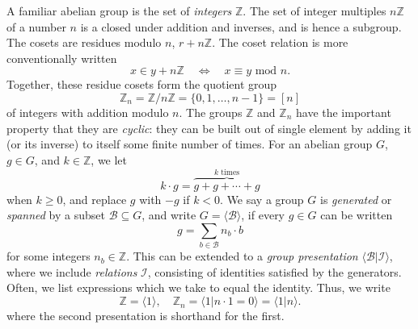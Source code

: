 \documentclass[aps, pre,reprint,nofootinbib,citeautoscript,floatfix]{revtex4-1}
\begin{document}
A familiar abelian group is the set of \emph{integers} $\mathbb{Z}$.
The set of integer multiples $n\mathbb{Z}$ of a number $n$ is a closed under
addition and inverses, and is hence a subgroup.
The cosets are residues modulo $n$, $r + n\mathbb{Z}$. The coset
relation is more conventionally written
\begin{equation}
  \label{eq:66}
  x \in y + n\mathbb{Z} \quad \Longleftrightarrow \quad x \equiv y
  \text{ mod } n.
\end{equation}
Together, these residue cosets form the quotient group
\begin{equation}
\mathbb{Z}_n = \mathbb{Z}/n \mathbb{Z} = \{0, 1, \ldots, n-1\} = [n]\label{eq:72}
\end{equation}
of integers with addition modulo $n$.
The groups $\mathbb{Z}$ and $\mathbb{Z}_n$ have the important property
that they are \emph{cyclic}: they can be built out of single element by adding it (or its inverse) to itself some finite number
of times.
For an abelian group $G$, $g\in G$, and $k \in \mathbb{Z}$, we let
\begin{equation}
  \label{eq:67}
  k \cdot g = \overset{k \text{ times}}{\overbrace{g + g + \cdots + g}}
\end{equation}
when $k \geq 0$, and replace $g$ with $-g$ if $k < 0$.
We say a group $G$ is \emph{generated} or \emph{spanned} by a subset $\mathcal{B} \subseteq G$, and write $G =
\langle \mathcal{B}\rangle$, if every $g\in G$ can be written
\begin{equation}
  \label{eq:68}
  g = \sum_{b\in \mathcal{B}} n_b \cdot b
\end{equation}
for some integers $n_b\in\mathbb{Z}$.
This can be extended to a \emph{group presentation} $\langle
\mathcal{B}|\mathcal{I}\rangle$, where we include \emph{relations}
$\mathcal{I}$, consisting of identities satisfied by the
generators. Often, we list expressions which we take to equal the identity. Thus, we write
\begin{equation}
  \label{eq:69}
  \mathbb{Z} = \langle 1\rangle, \quad \mathbb{Z}_n = \langle 1 | n
  \cdot 1 = 0\rangle = \langle 1 | n \rangle.
\end{equation}
where the second presentation is shorthand for the first.
\end{document}
